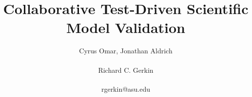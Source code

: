 \documentclass[9pt]{sig-alternate}
\begin{document}
%
\title{Collaborative Test-Driven Scientific Model Validation}


\author{\alignauthor
Cyrus Omar, Jonathan Aldrich\\\\
       \alignauthor Richard C. Gerkin\\
       \\{rgerkin@asu.edu}
}


% 








\maketitle
\end{document}
